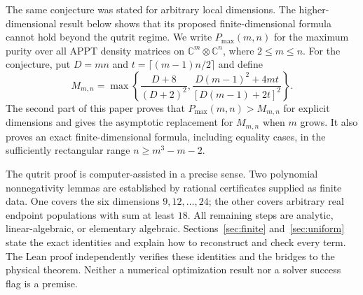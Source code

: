 \documentclass[11pt]{article}
\theoremstyle{remark}\newtheorem{remark}[theorem]{Remark}
\newcommand{\C}{\mathbb C}
\begin{document}
The same conjecture was stated for arbitrary local dimensions. The higher-dimensional result below shows that its proposed finite-dimensional formula cannot hold beyond the qutrit regime. We write $P_{\max}(m,n)$ for the maximum purity over all APPT density matrices on $\C^m\otimes\C^n$, where $2\leq m\leq n$. For the conjecture, put $D=mn$ and $t=\lceil(m-1)n/2\rceil$ and define
\begin{equation}\label{eq:general-candidate}
 M_{m,n}=\max\left\{\frac{D+8}{(D+2)^2},
 \frac{D(m-1)^2+4mt}{[D(m-1)+2t]^2}\right\}.
\end{equation}
The second part of this paper proves that $P_{\max}(m,n)>M_{m,n}$ for explicit dimensions and gives the asymptotic replacement for $M_{m,n}$ when $m$ grows. It also proves an exact finite-dimensional formula, including equality cases, in the sufficiently rectangular range $n\geq m^3-m-2$.

The qutrit proof is computer-assisted in a precise sense. Two polynomial nonnegativity lemmas are established by rational certificates supplied as finite data. One covers the six dimensions $9,12,\ldots,24$; the other covers arbitrary real endpoint populations with sum at least $18$. All remaining steps are analytic, linear-algebraic, or elementary algebraic. Sections~\ref{sec:finite} and~\ref{sec:uniform} state the exact identities and explain how to reconstruct and check every term. The Lean proof independently verifies these identities and the bridges to the physical theorem. Neither a numerical optimization result nor a solver success flag is a premise.
\end{document}
